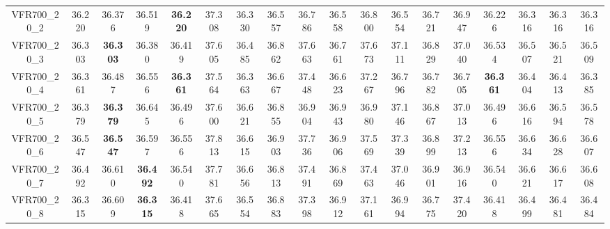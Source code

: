 \begin{tabular}{cc|ccc|ccccccccccccc}
VFR700\_20\_2      & 36.220           & 36.376           & 36.519           & {\bf 36.220}     & 37.308           & 36.330           & 36.557           & 36.786           & 36.558           & 36.800           & 36.554           & 36.721           & 36.947           & 36.226           & 36.316           & 36.316           & 36.316          \\ 
VFR700\_20\_3      & 36.303           & {\bf 36.303}     & 36.380           & 36.419           & 37.605           & 36.485           & 36.862           & 37.663           & 36.761           & 37.673           & 37.111           & 36.829           & 37.040           & 36.534           & 36.507           & 36.521           & 36.509          \\ 
VFR700\_20\_4      & 36.361           & 36.487           & 36.556           & {\bf 36.361}     & 37.564           & 36.363           & 36.667           & 37.448           & 36.623           & 37.267           & 36.796           & 36.782           & 36.705           & {\bf 36.361}     & 36.404           & 36.413           & 36.385          \\ 
VFR700\_20\_5      & 36.379           & {\bf 36.379}     & 36.645           & 36.496           & 37.600           & 36.621           & 36.855           & 36.904           & 36.943           & 36.980           & 37.146           & 36.867           & 37.013           & 36.496           & 36.616           & 36.594           & 36.578          \\ 
VFR700\_20\_6      & 36.547           & {\bf 36.547}     & 36.597           & 36.556           & 37.813           & 36.615           & 36.903           & 37.736           & 36.906           & 37.569           & 37.339           & 36.899           & 37.213           & 36.556           & 36.634           & 36.628           & 36.607          \\ 
VFR700\_20\_7      & 36.492           & 36.610           & {\bf 36.492}     & 36.540           & 37.781           & 36.656           & 36.813           & 37.491           & 36.869           & 37.463           & 37.046           & 36.901           & 36.916           & 36.540           & 36.621           & 36.617           & 36.608          \\ 
VFR700\_20\_8      & 36.315           & 36.609           & {\bf 36.315}     & 36.418           & 37.665           & 36.554           & 36.883           & 37.398           & 36.912           & 37.161           & 36.994           & 36.775           & 37.420           & 36.418           & 36.499           & 36.481           & 36.484          \\ 

\end{tabular}
